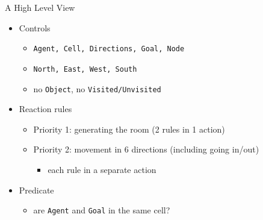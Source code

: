 \documentclass{beamer}
\begin{document}
\begin{frame}{A High Level View}
  \begin{itemize}
  \item Controls
    \begin{itemize}
    \item \texttt{Agent, Cell, Directions, \alert{Goal}, \alert{Node}}
    \item \texttt{North, East, West, South}
    \item no \texttt{Object}, no \texttt{Visited/Unvisited}
    \end{itemize}
    \pause
  \item Reaction rules
    \begin{itemize}
    \item Priority 1: generating the room (2 rules in 1 action)
      \pause
    \item Priority 2: movement in 6 directions (including going in/out)
      \begin{itemize}
      \item each rule in a separate action
      \end{itemize}
    \end{itemize}
    \pause
  \item Predicate
    \begin{itemize}
    \item are \texttt{Agent} and \texttt{Goal} in the same cell?
    \end{itemize}
  \end{itemize}
\end{frame}
\end{document}
